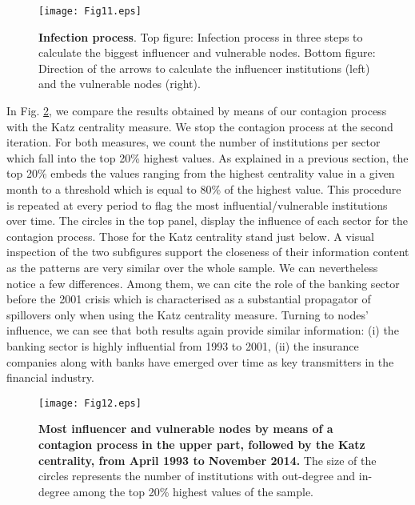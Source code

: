\documentclass[a4paper,10pt]{article}
\begin{document}
\begin{figure}[!h]
\centering
\texttt{[image: Fig11.eps]}
\caption{{\bf Infection process}. Top figure: Infection process in three steps to calculate the biggest influencer and vulnerable nodes. 
Bottom figure: Direction of the arrows to calculate the influencer institutions (left) and the vulnerable nodes (right).}
\label{fig:11}
\end{figure}
 In Fig. \ref{fig:12}, we compare the results obtained by means of our contagion process  with the Katz centrality measure. We 
 stop the contagion process at the second iteration. For both measures, we count the number of institutions per sector which 
 fall into the top 20\% highest values.  As explained in a previous section, the top 20\% embeds the values ranging from 
 the highest centrality value  in a given month to a threshold which is equal to 80\% of the highest value.  This  procedure 
 is repeated at every period to flag the most influential/vulnerable institutions over time.  The circles in the top panel, 
 display the influence of each sector  for the contagion process.  Those for the Katz   centrality stand just below.   A
 visual inspection of the two subfigures support the closeness of their information content as the patterns are very similar
 over the whole sample. We can nevertheless notice a few differences.  Among them, we can cite the role of the banking sector
 before the 2001 crisis which is characterised as a substantial propagator of spillovers only when using the Katz centrality 
 measure. Turning to nodes’ influence, we can see that both results again provide similar information: (i) the banking sector 
 is highly influential from 1993 to 2001, (ii) the insurance companies along with banks have emerged over time as key
 transmitters in the financial industry.
 
\begin{figure}[!h]
\texttt{[image: Fig12.eps]}
\caption{{\bf Most influencer and vulnerable nodes by means of a contagion process in the upper part, followed by the Katz 
centrality, from April 1993 to November 2014.} The size of the circles represents the number of institutions with out-degree and in-degree among the top 20\% highest values of the sample.}
\label{fig:12}
\end{figure}
\end{document}
